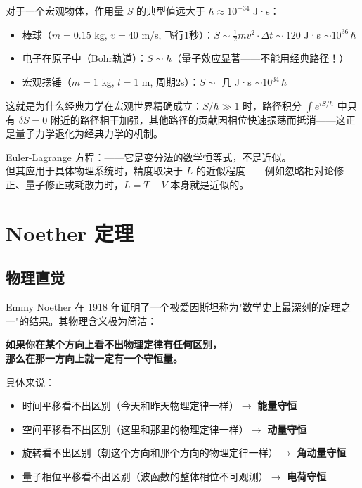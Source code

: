 \begin{oombox}
  对于一个宏观物体，作用量 $S$ 的典型值远大于 $\hbar \approx 10^{-34}$ J·s：
  \begin{itemize}
    \item 棒球（$m=0.15$ kg, $v=40$ m/s, 飞行1秒）：$S \sim \frac{1}{2}mv^2 \cdot \Delta t \sim 120$ J·s $\sim 10^{36}\,\hbar$
    \item 电子在原子中（Bohr轨道）：$S \sim \hbar$（量子效应显著——不能用经典路径！）
    \item 宏观摆锤（$m=1$ kg, $l=1$ m, 周期2s）：$S \sim$ 几 J·s $\sim 10^{34}\,\hbar$
  \end{itemize}
  这就是为什么经典力学在宏观世界精确成立：$S/\hbar \gg 1$ 时，路径积分 $\int e^{iS/\hbar}$ 中只有 $\delta S=0$ 附近的路径相干加强，其他路径的贡献因相位快速振荡而抵消——这正是量子力学退化为经典力学的机制。
\end{oombox}

\precisionbox[精度等级]
  Euler-Lagrange 方程：\precexact ——它是变分法的数学恒等式，不是近似。\\
  但其应用于具体物理系统时，精度取决于 $L$ 的近似程度——例如忽略相对论修正、量子修正或耗散力时，$L = T-V$ 本身就是近似的。
\endprecisionbox

\section{Noether 定理}

\subsection{物理直觉}

Emmy Noether 在 1918 年证明了一个被爱因斯坦称为"数学史上最深刻的定理之一"的结果。其物理含义极为简洁：

\begin{center}
\textbf{如果你在某个方向上看不出物理定律有任何区别，\\
那么在那一方向上就一定有一个守恒量。}
\end{center}

具体来说：
\begin{itemize}
  \item 时间平移看不出区别（今天和昨天物理定律一样）$\to$ \textbf{能量守恒}
  \item 空间平移看不出区别（这里和那里的物理定律一样）$\to$ \textbf{动量守恒}
  \item 旋转看不出区别（朝这个方向和那个方向的物理定律一样）$\to$ \textbf{角动量守恒}
  \item 量子相位平移看不出区别（波函数的整体相位不可观测）$\to$ \textbf{电荷守恒}
\end{itemize}

